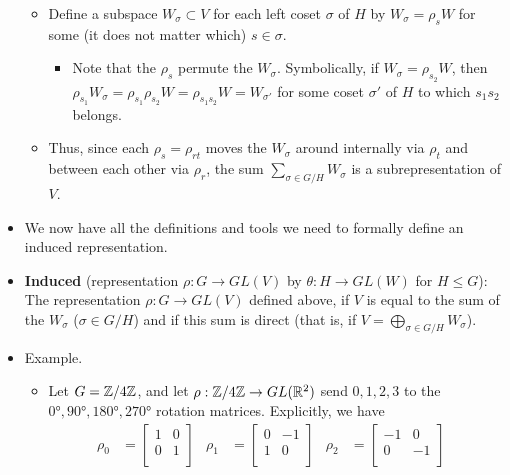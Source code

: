 \documentclass[../notes.tex]{subfiles}
\begin{document}
\begin{itemize}
\begin{itemize}
        \item Define a subspace $W_\sigma\subset V$ for each left coset $\sigma$ of $H$ by $W_\sigma=\rho_sW$ for some (it does not matter which) $s\in\sigma$.
        \begin{itemize}
            \item Note that the $\rho_s$ permute the $W_\sigma$. Symbolically, if $W_\sigma=\rho_{s_2}W$, then $\rho_{s_1}W_\sigma=\rho_{s_1}\rho_{s_2}W=\rho_{s_1s_2}W=W_{\sigma'}$ for some coset $\sigma'$ of $H$ to which $s_1s_2$ belongs.
        \end{itemize}
        \item Thus, since each $\rho_s=\rho_{rt}$ moves the $W_\sigma$ around internally via $\rho_t$ and between each other via $\rho_r$, the sum $\sum_{\sigma\in G/H}W_\sigma$ is a subrepresentation of $V$.
    \end{itemize}
    \item We now have all the definitions and tools we need to formally define an induced representation.
    \item \textbf{Induced} (representation $\rho:G\to GL(V)$ by $\theta:H\to GL(W)$ for $H\leq G$): The representation $\rho:G\to GL(V)$ defined above, if $V$ is equal to the sum of the $W_\sigma$ ($\sigma\in G/H$) and if this sum is direct (that is, if $V=\bigoplus_{\sigma\in G/H}W_\sigma$).
    \item Example.
    \begin{itemize}
        \item Let $G=\mathbb{Z}/4\mathbb{Z}$, and let $\rho:\mathbb{Z}/4\mathbb{Z}\to GL(\mathbb{R}^2)$ send $0,1,2,3$ to the $\ang{0},\ang{90},\ang{180},\ang{270}$ rotation matrices. Explicitly, we have
        \begin{align*}
            \rho_0 &=
            \begin{bmatrix}
                1 & 0\\
                0 & 1\\
            \end{bmatrix}&
            \rho_1 &=
            \begin{bmatrix}
                0 & -1\\
                1 & 0\\
            \end{bmatrix}&
            \rho_2 &=
            \begin{bmatrix}
                -1 & 0\\
                0 & -1\\
            \end{bmatrix}&

\end{align*}
\end{itemize}
\end{itemize}
\end{document}

